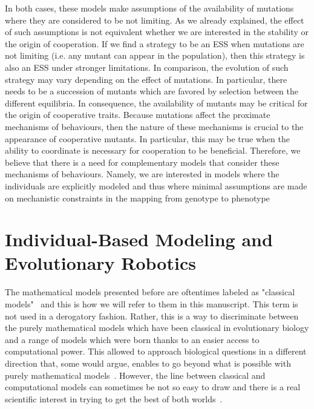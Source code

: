             In both cases, these models make assumptions of the availability of mutations where they are considered to be not limiting. As we already explained, the effect of such assumptions is not equivalent whether we are interested in the stability or the origin of cooperation. If we find a strategy to be an ESS when mutations are not limiting (i.e. any mutant can appear in the population), then this strategy is also an ESS under stronger limitations. In comparison, the evolution of such strategy may vary depending on the effect of mutations. In particular, there needs to be a succession of mutants which are favored by selection between the different equilibria. In consequence, the availability of mutants may be critical for the origin of cooperative traits. Because mutations affect the proximate mechanisms of behaviours, then the nature of these mechanisms is crucial to the appearance of cooperative mutants. In particular, this may be true when the ability to coordinate is necessary for cooperation to be beneficial. Therefore, we believe that there is a need for complementary models that consider these mechanisms of behaviours. Namely, we are interested in models where the individuals are explicitly modeled and thus where minimal assumptions are made on mechanistic constraints in the mapping from genotype to phenotype



\section{Individual-Based Modeling and Evolutionary Robotics}

    The mathematical models presented before are oftentimes labeled as "classical models"~\parencite{DeAngelis2005, Adami2014} and this is how we will refer to them in this manuscript. This term is not used in a derogatory fashion. Rather, this is a way to discriminate between the purely mathematical models which have been classical in evolutionary biology and a range of models which were born thanks to an easier access to computational power. This allowed to approach biological questions in a different direction that, some would argue, enables to go beyond what is possible with purely mathematical models~\parencite{Adami2012}. However, the line between classical and computational models can sometimes be not so easy to draw and there is a real scientific interest in trying to get the best of both worlds~\parencite{Wilson1998}.


